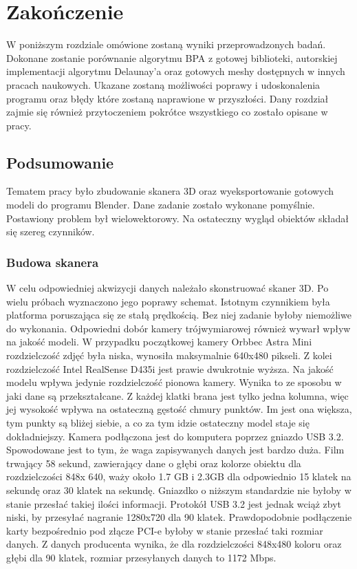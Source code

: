 \chapter{Zakończenie}
W poniższym rozdziale omówione zostaną wyniki przeprowadzonych badań. Dokonane zostanie porównanie algorytmu BPA z gotowej biblioteki, autorskiej implementacji algorytmu Delaunay'a oraz gotowych meshy dostępnych w innych pracach naukowych. Ukazane zostaną możliwości poprawy i udoskonalenia programu oraz błędy które zostaną naprawione w przyszłości. Dany rozdział zajmie się również przytoczeniem pokrótce wszystkiego co zostało opisane w pracy.

\section{Podsumowanie}
Tematem pracy było zbudowanie skanera 3D oraz wyeksportowanie gotowych modeli do programu Blender. Dane zadanie zostało wykonane pomyślnie. Postawiony problem był wielowektorowy. Na ostateczny wygląd obiektów składał się szereg czynników.
\subsection{Budowa skanera}
W celu odpowiedniej akwizycji danych należało skonstruować skaner 3D. Po wielu próbach wyznaczono jego poprawy schemat. Istotnym czynnikiem była platforma poruszająca się ze stałą prędkością. Bez niej zadanie byłoby niemożliwe do wykonania. Odpowiedni dobór kamery trójwymiarowej również wywarł wpływ na jakość modeli. W przypadku początkowej kamery Orbbec Astra Mini rozdzielczość zdjęć była niska, wynosiła maksymalnie 640x480 pikseli. Z kolei rozdzielczość Intel RealSense D435i jest prawie dwukrotnie wyższa. Na jakość modelu wpływa jedynie rozdzielczość pionowa kamery. Wynika to ze sposobu w jaki dane są przekształcane. Z każdej klatki brana jest tylko jedna kolumna, więc jej wysokość wpływa na ostateczną gęstość chmury punktów. Im jest ona większa, tym punkty są bliżej siebie, a co za tym idzie ostateczny model staje się dokładniejszy. Kamera podłączona jest do komputera poprzez gniazdo USB 3.2. Spowodowane jest to tym, że waga zapisywanych danych jest bardzo duża. Film trwający 58 sekund, zawierający dane o głębi oraz kolorze obiektu dla rozdzielczości 848x 640, waży około 1.7 GB i 2.3GB dla odpowiednio 15 klatek na sekundę oraz 30 klatek na sekundę. Gniazdko o niższym standardzie nie byłoby w stanie przesłać takiej ilości informacji. Protokół USB 3.2 jest jednak wciąż zbyt niski, by przesyłać nagranie 1280x720 dla 90 klatek. Prawdopodobnie podłączenie karty bezpośrednio pod złącze PCI-e byłoby w stanie przesłać taki rozmiar danych. Z danych producenta wynika, że dla rozdzielczości 848x480 koloru oraz głębi dla 90 klatek, rozmiar przesyłanych danych to 1172 Mbps.

